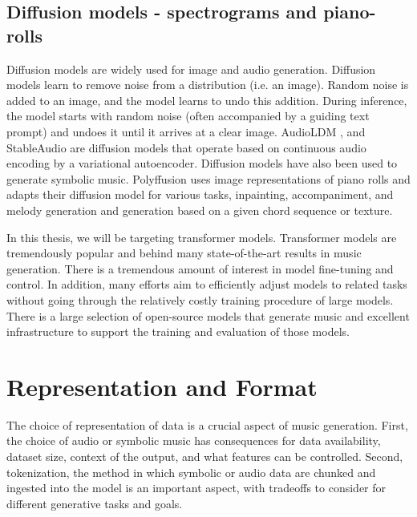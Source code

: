 \subsection{Diffusion models - spectrograms and piano-rolls}
Diffusion models are widely used for image and audio generation. Diffusion models learn to remove noise from a distribution (i.e. an image). Random noise is added to an image, and the model learns to undo this addition. During inference, the model starts with random noise (often accompanied by a guiding text prompt) and undoes it until it arrives at a clear image. AudioLDM \cite{Liu_Chen_Yuan_Mei_Liu_Mandic_Wang_Plumbley_2023}, and StableAudio \cite{Evans_Parker_Carr_Zukowski_Taylor_Pons_2024} are diffusion models that operate based on continuous audio encoding by a variational autoencoder. Diffusion models have also been used to generate symbolic music. Polyffusion \cite{Min_Jiang_Xia_Zhao_polyffusion_2023} uses image representations of piano rolls and adapts their diffusion model for various tasks, inpainting, accompaniment, and melody generation and generation based on a given chord sequence or texture. 

In this thesis, we will be targeting transformer models. Transformer models are tremendously popular and behind many state-of-the-art results in music generation. There is a tremendous amount of interest in model fine-tuning and control. In addition, many efforts aim to efficiently adjust models to related tasks without going through the relatively costly training procedure of large models. There is a large selection of open-source models that generate music and excellent infrastructure to support the training and evaluation of those models. 

\section{Representation and Format}\label{section:representation}
The choice of representation of data is a crucial aspect of music generation. First, the choice of audio or symbolic music has consequences for data availability, dataset size, context of the output, and what features can be controlled. Second, tokenization, the method in which symbolic or audio data are chunked and ingested into the model is an important aspect, with tradeoffs to consider for different generative tasks and goals. 


